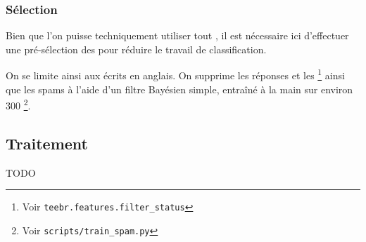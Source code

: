 \subsubsection{Sélection}

Bien que l’on puisse techniquement utiliser tout \tweet{}, il est nécessaire
ici d’effectuer une pré-sélection des \tweets{} pour réduire le travail de
classification.

On se limite ainsi aux \tweets{} écrits en anglais. On supprime les réponses
et les \rts{}\footnote{Voir \verb|teebr.features.filter_status|} ainsi que les
spams à l’aide d’un filtre Bayésien simple, entraîné à la main sur environ 300
\tweets{}\footnote{Voir \verb|scripts/train_spam.py|}.

\subsection{Traitement}

TODO
